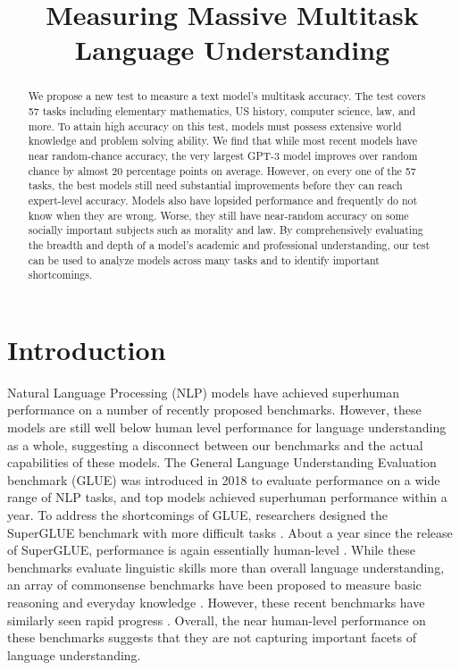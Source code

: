 \title{Measuring Massive Multitask\\Language Understanding}



\maketitle

\vspace{-35pt}
\begin{abstract}
We propose a new test to measure a text model's multitask accuracy. The test covers 57 tasks including elementary mathematics, US history, computer science, law, and more. To attain high accuracy on this test, models must possess extensive world knowledge and problem solving ability. We find that while most recent models have near random-chance accuracy, the very largest GPT-3 model improves over random chance by almost 20 percentage points on average. However, on every one of the 57 tasks, the best models still need substantial improvements before they can reach expert-level accuracy. Models also have lopsided performance and frequently do not know when they are wrong. Worse, they still have near-random accuracy on some socially important subjects such as morality and law. By comprehensively evaluating the breadth and depth of a model's academic and professional understanding, our test can be used to analyze models across many tasks and to identify important shortcomings.
\end{abstract}

\section{Introduction}

Natural Language Processing (NLP) models have achieved superhuman performance on a number of recently proposed benchmarks. 
However, these models are still well below human level performance for language understanding as a whole, suggesting a disconnect between our benchmarks and the actual capabilities of these models. 
The General Language Understanding Evaluation benchmark (GLUE) \citep{wang2018glue} was introduced in 2018 to evaluate performance on a wide range of NLP tasks, and top models achieved superhuman performance within a year. To address the shortcomings of GLUE, researchers designed the SuperGLUE benchmark with more difficult tasks \citep{wang2019superglue}. About a year since the release of SuperGLUE, performance is again essentially human-level \citep{raffel2019exploringT5}. While these benchmarks evaluate linguistic skills more than overall language understanding, an array of commonsense benchmarks have been proposed to measure basic reasoning and everyday knowledge \citep{zellers2019hellaswag,huang2019cosmosqa,bisk2019physicaliqa}. 
However, these recent benchmarks have similarly seen rapid progress \citep{khashabi2020unifiedqa}. Overall, the near human-level performance on these benchmarks suggests that they are not capturing important facets of language understanding.

